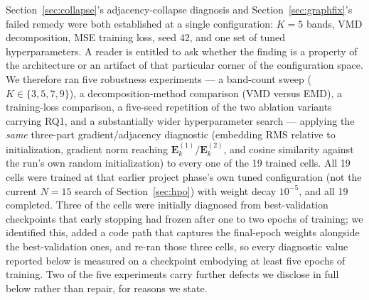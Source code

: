 \documentclass[journal]{IEEEtran}
\begin{document}
Section~\ref{sec:collapse}'s adjacency-collapse diagnosis and
Section~\ref{sec:graphfix}'s failed remedy were both established at a single
configuration: $K=5$ bands, VMD decomposition, MSE training loss, seed 42, and
one set of tuned hyperparameters. A reader is entitled to ask whether the finding
is a property of the architecture or an artifact of that particular corner of the
configuration space. We therefore ran five robustness experiments --- a
band-count sweep ($K \in \{3,5,7,9\}$), a decomposition-method comparison (VMD
versus EMD), a training-loss comparison, a five-seed repetition of the two
ablation variants carrying RQ1, and a substantially wider hyperparameter search
--- applying the \emph{same} three-part gradient/adjacency diagnostic (embedding
RMS relative to initialization, gradient norm reaching
$\mathbf{E}^{(1)}_k/\mathbf{E}^{(2)}_k$, and cosine similarity against the run's
own random initialization) to every one of the 19 trained cells. All 19 cells
were trained at that earlier project phase's own tuned configuration (not the
current $N=15$ search of Section~\ref{sec:hpo}) with weight
decay $10^{-5}$, and all 19 completed. Three of the cells were initially
diagnosed from best-validation checkpoints that early stopping had frozen after
one to two epochs of training; we identified this, added a code path that
captures the final-epoch weights alongside the best-validation ones, and re-ran
those three cells, so every diagnostic value reported below is measured on a
checkpoint embodying at least five epochs of training. Two of the five
experiments carry further defects we disclose in full below rather than repair,
for reasons we state.
\end{document}

